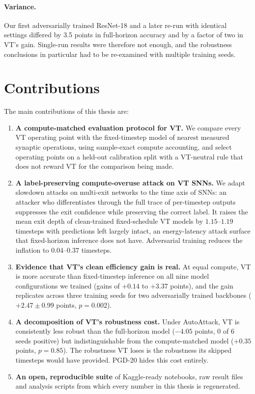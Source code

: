 \paragraph{Variance.} Our first adversarially trained ResNet-18 and a later re-run with identical settings differed by 3.5 points in full-horizon accuracy and by a factor of two in VT's gain. Single-run results were therefore not enough, and the robustness conclusions in particular had to be re-examined with multiple training seeds.

\section{Contributions}
\label{sec:intro-contrib}

The main contributions of this thesis are:

\begin{enumerate}[label=\textbf{C\arabic*.}, leftmargin=1.2cm]
    \item \textbf{A compute-matched evaluation protocol for VT.} We compare every VT operating point with the fixed-timestep model of nearest measured synaptic operations, using sample-exact compute accounting, and select operating points on a held-out calibration split with a VT-neutral rule that does not reward VT for the comparison being made.
    \item \textbf{A label-preserving compute-overuse attack on VT SNNs.} We adapt slowdown attacks on multi-exit networks to the time axis of SNNs: an attacker who differentiates through the full trace of per-timestep outputs suppresses the exit confidence while preserving the correct label. It raises the mean exit depth of clean-trained fixed-schedule VT models by $1.15$--$1.19$ timesteps with predictions left largely intact, an energy-latency attack surface that fixed-horizon inference does not have. Adversarial training reduces the inflation to $0.04$--$0.37$ timesteps.
    \item \textbf{Evidence that VT's clean efficiency gain is real.} At equal compute, VT is more accurate than fixed-timestep inference on all nine model configurations we trained (gains of $+0.14$ to $+3.37$ points), and the gain replicates across three training seeds for two adversarially trained backbones ($+2.47 \pm 0.99$ points, $p = 0.002$).
    \item \textbf{A decomposition of VT's robustness cost.} Under AutoAttack, VT is consistently less robust than the full-horizon model ($-4.05$ points, 0 of 6 seeds positive) but indistinguishable from the compute-matched model ($+0.35$ points, $p = 0.85$). The robustness VT loses is the robustness its skipped timesteps would have provided. PGD-20 hides this cost entirely.
    \item \textbf{An open, reproducible suite} of Kaggle-ready notebooks, raw result files and analysis scripts from which every number in this thesis is regenerated.
\end{enumerate}

